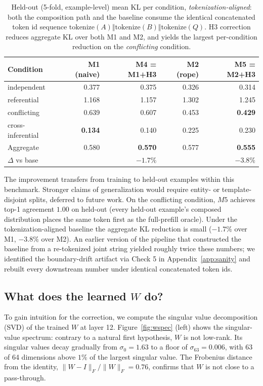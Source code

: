 \documentclass[11pt]{article}
\begin{document}
\begin{table}[t]
\centering
\caption{Held-out (5-fold, example-level) mean KL per condition, \emph{tokenization-aligned}: both the composition path and the baseline consume the identical concatenated token id sequence $\mathrm{tokenize}(A) \Vert \mathrm{tokenize}(B) \Vert \mathrm{tokenize}(Q)$. H3 correction reduces aggregate KL over both M1 and M2, and yields the largest per-condition reduction on the \emph{conflicting} condition.}
\label{tab:holdout}
\begin{tabular}{lrrrr}
\toprule
Condition & M1 (naive) & M4 = M1+H3 & M2 (rope) & M5 = M2+H3 \\
\midrule
independent        & 0.377 & 0.375 & 0.326 & 0.314 \\
referential        & 1.168 & 1.157 & 1.302 & 1.245 \\
conflicting        & 0.639 & 0.607 & 0.453 & \textbf{0.429} \\
cross-inferential  & \textbf{0.134} & 0.140 & 0.225 & 0.230 \\
\midrule
Aggregate          & 0.580 & \textbf{0.570} & 0.577 & \textbf{0.555} \\
$\Delta$ vs base   &       & $-1.7\%$ &       & $-3.8\%$ \\
\bottomrule
\end{tabular}
\end{table}

The improvement transfers from training to held-out examples within this benchmark. Stronger claims of generalization would require entity- or template-disjoint splits, deferred to future work. On the conflicting condition, $M5$ achieves top-1 agreement $1.00$ on held-out (every held-out example's composed distribution places the same token first as the full-prefill oracle). Under the tokenization-aligned baseline the aggregate KL reduction is small ($-1.7\%$ over M1, $-3.8\%$ over M2). An earlier version of the pipeline that constructed the baseline from a re-tokenized joint string yielded roughly twice these numbers; we identified the boundary-drift artifact via Check 5 in Appendix~\ref{app:sanity} and rebuilt every downstream number under identical concatenated token ids.

\subsection{What does the learned $W$ do?}\label{sec:interp}

To gain intuition for the correction, we compute the singular value decomposition (SVD) of the trained $W$ at layer 12. Figure~\ref{fig:wspec} (left) shows the singular-value spectrum: contrary to a natural first hypothesis, $W$ is not low-rank. Its singular values decay gradually from $\sigma_0 = 1.63$ to a floor of $\sigma_{63} = 0.006$, with 63 of 64 dimensions above $1\%$ of the largest singular value. The Frobenius distance from the identity, $\lVert W - I \rVert_F / \lVert W \rVert_F = 0.76$, confirms that $W$ is not close to a pass-through.
\end{document}
